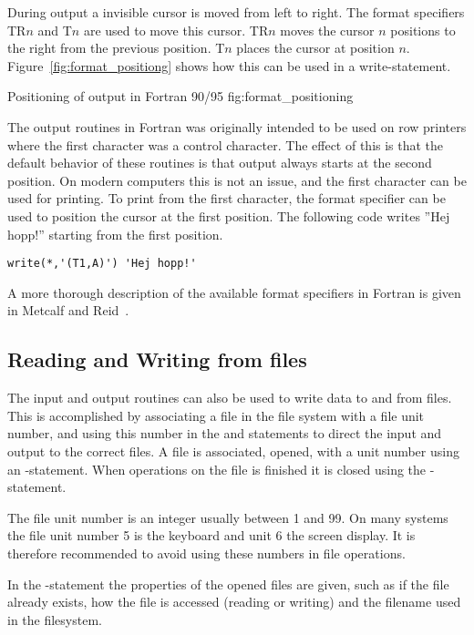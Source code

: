 During output a invisible cursor is moved from left to right. The format specifiers TR$n$ and T$n$ are used to move this cursor. TR$n$ moves the cursor $n$ positions to the right from the previous position. T$n$ places the cursor at position $n$. Figure~\ref{fig:format_positiong} shows how this can be used in a write-statement.

 {Positioning of output in Fortran
90/95} {fig:format_positioning}

The output routines in Fortran was originally intended to be used on row printers where the first character was a control character. The effect of this is that the default behavior of these routines is that output always starts at the second position. On modern computers this is not an issue, and the first character can be used for printing. To print from the first character, the format specifier  can be used to position the cursor at the first position. The following code writes ''Hej hopp!'' starting from the first position.

\begin{lstlisting}
write(*,'(T1,A)') 'Hej hopp!'
\end{lstlisting}

A more thorough description of the available format specifiers in Fortran is given in Metcalf and Reid~\cite{metcalf00}.

\subsection{Reading and Writing from files}

The input and output routines can also be used to write data to and from files. This is accomplished by associating a file in the file system with a file unit number, and using this number in the  and  statements to direct the input and output to the correct files. A file is associated, opened, with a unit number using an -statement. When operations on the file is finished it is closed using the
-statement. 

The file unit number is an integer usually between 1 and 99. On many systems the file unit number 5 is the keyboard and unit 6 the screen display. It is therefore recommended to avoid using these numbers in file operations.

In the -statement the properties of the opened files are given, such as if the file already exists, how the file is accessed (reading or writing) and the filename used in the filesystem.

